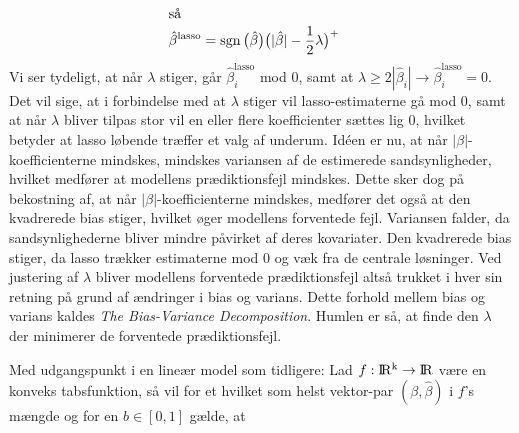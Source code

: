 \documentclass[11pt,a4paper]{article}
\DeclareMathOperator{\sgn}{sgn}
\begin{document}
\begin{align}
\intertext{så}
 &\hat{\beta}^{\text{lasso}}=\sgn\big{(}\hat{\beta}\big{)}\big{(}|\hat{\beta}|-\frac{1}{2}\lambda\big{)}^{+}\label{lig:LassoLøsning}
\end{align}
Vi ser tydeligt, at når $\lambda$ stiger, går $\hat{\beta}_i^{\text{lasso}}$ mod 0, samt at $\lambda\geq2|\hat{\beta}_i|\rightarrow \hat{\beta}_i^{\text{lasso}}=0$. Det vil sige, at i forbindelse med at $\lambda$ stiger vil lasso-estimaterne gå mod 0, samt at når $\lambda$ bliver tilpas stor vil en eller flere koefficienter sættes lig 0, hvilket betyder at lasso løbende træffer et valg af underum. Idéen er nu, at når $|\beta|$-koefficienterne mindskes, mindskes variansen af de estimerede sandsynligheder, hvilket medfører at modellens prædiktionsfejl mindskes. Dette sker dog på bekostning af, at når $|\beta|$-koefficienterne mindskes, medfører det også at den kvadrerede bias stiger, hvilket øger modellens forventede fejl. Variansen falder, da sandsynlighederne bliver mindre påvirket af deres kovariater. Den kvadrerede bias stiger, da lasso trækker estimaterne mod 0 og væk fra de centrale løsninger. Ved justering af $\lambda$ bliver modellens forventede prædiktionsfejl altså trukket i hver sin retning på grund af ændringer i bias og varians. Dette forhold mellem bias og varians kaldes \textit{The Bias-Variance Decomposition}\cite{ESL}. Humlen er så, at finde den $\lambda$ der minimerer de forventede prædiktionsfejl.\par
Med udgangspunkt i en lineær model som tidligere: Lad $f:\rm I\!R^k \rightarrow \rm I\!R$ være en konveks tabsfunktion, så vil for et hvilket som helst vektor-par $(\beta, \hat{\beta})$ i $f$'s mængde og for en $b\in [0,1]$ gælde, at
\end{document}
